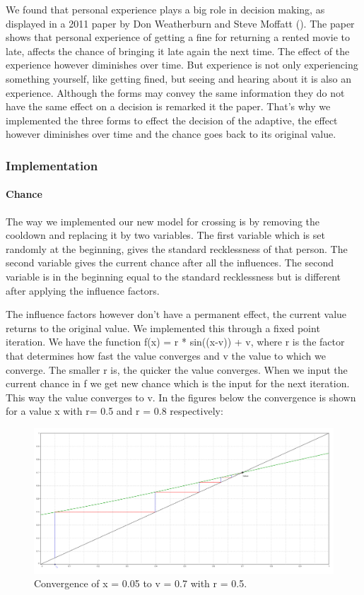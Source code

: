 \documentclass[a4paper]{article}
\begin{document}
We found that personal experience plays a big role in decision making, as displayed in a 2011 paper by Don Weatherburn and Steve Moffatt (\cite{movies}). The paper shows that personal experience of getting a fine for returning a rented movie to late, affects the chance of bringing it late again the next time. The effect of the experience however diminishes over time. But experience is not only experiencing something yourself, like getting fined, but seeing and hearing about it is also an experience. Although the forms may convey the same information they do not have the same effect on a decision is remarked it the paper. That's why we implemented the three forms to effect the decision of the adaptive, the effect however diminishes over time and the chance goes back to its original value.


\subsubsection{Implementation}
\paragraph{Chance}
The way we implemented our new model for crossing is by removing the cooldown and replacing it by two variables. The first variable which is set randomly at the beginning, gives the standard recklessness of that person. The second variable gives the current chance after all the influences. The second variable is in the beginning equal to the standard recklessness but is different after applying the influence factors.

The influence factors however don't have a permanent effect, the current value returns to the original value. We implemented this through a fixed point iteration. We have the function f(x) = r * sin((x-v)) + v, where r is the factor that determines how fast the value converges and v the value to which we converge. The smaller r is, the quicker the value converges. When we input the current chance in f we get new chance which is the input for the next iteration. This way the value converges to v. In the figures below the convergence is shown for a value x with r= 0.5 and r = 0.8 respectively:

\begin{figure}[H]
\centering
\includegraphics[width=.9\textwidth]{iteration1.png}
\caption{Convergence of x = 0.05 to v = 0.7 with r = 0.5.}
\label{ABlabel}
\end{figure}
\end{document}
